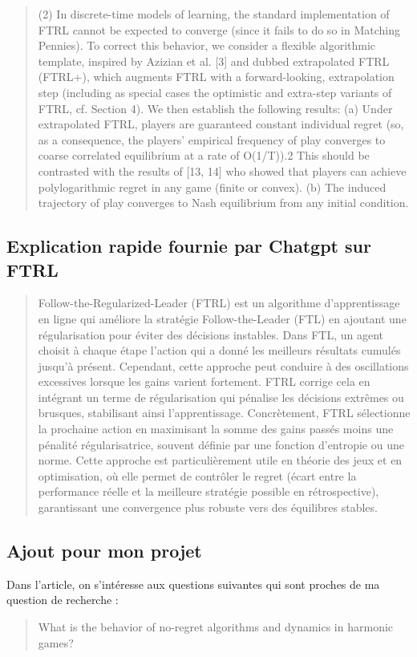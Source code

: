 \documentclass{article}
\begin{document}
\begin{quote}
(2) In discrete-time models of learning, the standard implementation of FTRL cannot be
expected to converge (since it fails to do so in Matching Pennies). To correct this
behavior, we consider a flexible algorithmic template, inspired by Azizian et al. [3] and
dubbed extrapolated FTRL (FTRL+), which augments FTRL with a forward-looking,
extrapolation step (including as special cases the optimistic and extra-step variants of
FTRL, cf. Section 4). We then establish the following results:
(a) Under extrapolated FTRL, players are guaranteed constant individual regret (so,
as a consequence, the players’ empirical frequency of play converges to coarse
correlated equilibrium at a rate of O(1/T)).2 This should be contrasted with the
results of [13, 14] who showed that players can achieve polylogarithmic regret in
any game (finite or convex).
(b) The induced trajectory of play converges to Nash equilibrium from any initial
condition.
\end{quote}

\subsection{Explication rapide fournie par Chatgpt sur FTRL}
\begin{quote}
    Follow-the-Regularized-Leader (FTRL) est un algorithme d’apprentissage en ligne qui améliore la stratégie Follow-the-Leader (FTL) en ajoutant une régularisation pour éviter des décisions instables. Dans FTL, un agent choisit à chaque étape l’action qui a donné les meilleurs résultats cumulés jusqu’à présent. Cependant, cette approche peut conduire à des oscillations excessives lorsque les gains varient fortement. FTRL corrige cela en intégrant un terme de régularisation qui pénalise les décisions extrêmes ou brusques, stabilisant ainsi l’apprentissage. Concrètement, FTRL sélectionne la prochaine action en maximisant la somme des gains passés moins une pénalité régularisatrice, souvent définie par une fonction d’entropie ou une norme. Cette approche est particulièrement utile en théorie des jeux et en optimisation, où elle permet de contrôler le regret (écart entre la performance réelle et la meilleure stratégie possible en rétrospective), garantissant une convergence plus robuste vers des équilibres stables.
\end{quote}

\subsection{Ajout pour mon projet}
Dans l'article, on s'intéresse aux questions suivantes qui sont proches de ma question de recherche : 
\\
\begin{quote}
    What is the behavior of no-regret algorithms and dynamics in harmonic games?
\end{quote}
\end{document}
